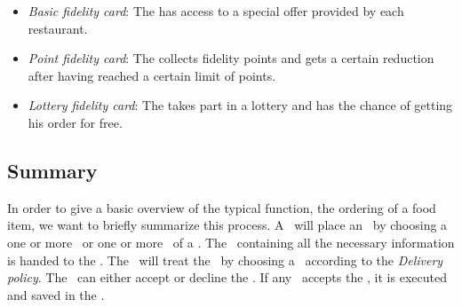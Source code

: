 \begin{itemize}
  \item \emph{Basic fidelity card}: The \Customer has access to a special offer provided by each restaurant.
  \item \emph{Point fidelity card}: The \Customer collects fidelity points
  and gets a certain reduction after 
	having reached a certain limit of points.
	\item \emph{Lottery fidelity card}: The \Customer takes part in a lottery
  and has the chance of getting his order for free.
\end{itemize}


\subsection{Summary} %

In order to give a basic overview of the typical function, the ordering of a food item,
we want to briefly summarize this process.
A \Customer~will place an \Order~by choosing a one or more \Meal~or one or more \Dish~of a \Restaurant.
The \Order~containing all the necessary information is handed to the \Core.
The \Core~will treat the \Order~by choosing a \Courier~according to the \emph{Delivery policy}. 
The \Courier~can either accept or decline the \Order. If any \Courier~accepts the \Order,
it is executed and saved in the \Core.


